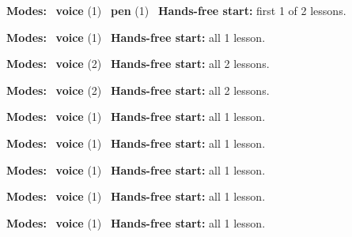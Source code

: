 \expandafter\def\csname hlchaptermodality21\endcsname{%
  {\small\noindent
    \textbf{Modes:} \hlvoicesign{}~\textbf{voice} (1) \quad \hlpensign{}~\textbf{pen} (1)\quad
    \hlvoicesign{}~\textbf{Hands-free start:} first 1 of 2 lessons.%
    \par}\medskip
}

\expandafter\def\csname hlchaptermodality22\endcsname{%
  {\small\noindent
    \textbf{Modes:} \hlvoicesign{}~\textbf{voice} (1)\quad
    \hlvoicesign{}~\textbf{Hands-free start:} all 1 lesson.%
    \par}\medskip
}

\expandafter\def\csname hlchaptermodality23\endcsname{%
  {\small\noindent
    \textbf{Modes:} \hlvoicesign{}~\textbf{voice} (2)\quad
    \hlvoicesign{}~\textbf{Hands-free start:} all 2 lessons.%
    \par}\medskip
}

\expandafter\def\csname hlchaptermodality24\endcsname{%
  {\small\noindent
    \textbf{Modes:} \hlvoicesign{}~\textbf{voice} (2)\quad
    \hlvoicesign{}~\textbf{Hands-free start:} all 2 lessons.%
    \par}\medskip
}

\expandafter\def\csname hlchaptermodality25\endcsname{%
  {\small\noindent
    \textbf{Modes:} \hlvoicesign{}~\textbf{voice} (1)\quad
    \hlvoicesign{}~\textbf{Hands-free start:} all 1 lesson.%
    \par}\medskip
}

\expandafter\def\csname hlchaptermodality26\endcsname{%
  {\small\noindent
    \textbf{Modes:} \hlvoicesign{}~\textbf{voice} (1)\quad
    \hlvoicesign{}~\textbf{Hands-free start:} all 1 lesson.%
    \par}\medskip
}

\expandafter\def\csname hlchaptermodality27\endcsname{%
  {\small\noindent
    \textbf{Modes:} \hlvoicesign{}~\textbf{voice} (1)\quad
    \hlvoicesign{}~\textbf{Hands-free start:} all 1 lesson.%
    \par}\medskip
}

\expandafter\def\csname hlchaptermodality28\endcsname{%
  {\small\noindent
    \textbf{Modes:} \hlvoicesign{}~\textbf{voice} (1)\quad
    \hlvoicesign{}~\textbf{Hands-free start:} all 1 lesson.%
    \par}\medskip
}

\expandafter\def\csname hlchaptermodality29\endcsname{%
  {\small\noindent
    \textbf{Modes:} \hlvoicesign{}~\textbf{voice} (1)\quad
    \hlvoicesign{}~\textbf{Hands-free start:} all 1 lesson.%
    \par}\medskip
}


